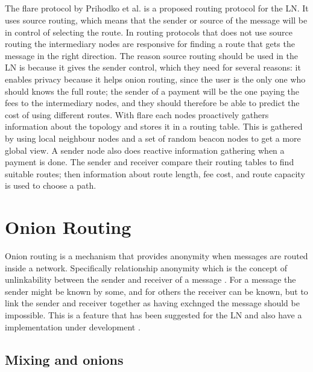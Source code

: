 \documentclass[informationsecurity]{gucmasterproject}
\begin{document}
\paragraph{}
The flare protocol by Prihodko et al.\cite{prihodko2016flare} is a proposed routing protocol for the LN. It uses source routing, which means that the sender or source of the message will be in control of selecting the route. In routing protocols that does not use source routing the intermediary nodes are responsive for finding a route that gets the message in the right direction. The reason source routing should be used in the LN is because it gives the sender control, which they need for several reasons\cite{prihodko2016flare}: it enables privacy because it helps onion routing, since the user is the only one who should knows the full route\cite{SB_onion}\cite{LN_onion_implementation}; the sender of a payment will be the one paying the fees to the intermediary nodes, and they should therefore be able to predict the cost of using different routes. With flare each nodes proactively gathers information about the topology and stores it in a routing table. This is gathered by using local neighbour nodes and a set of random beacon nodes to get a more global view. A sender node also does reactive information gathering when a payment is done. The sender and receiver compare their routing tables to find suitable routes; then information about route length, fee cost, and route capacity is used to choose a path. 

\chapter{Onion Routing}

Onion routing is a mechanism that provides anonymity when messages are routed inside a network. 
Specifically relationship anonymity which is the concept of unlinkability between the sender and receiver of a message \cite{pfitzmann2001anonymity}. For a message the sender might be known by some, and for others the receiver can be known, but to link the sender and receiver together as having exchnged the message should be impossible. This is a feature that has been suggested for the LN \cite{LNDM_onion}\cite{SB_onion} and also have a implementation under development \cite{LN_onion_implementation}.

\section{Mixing and onions}
\end{document}
